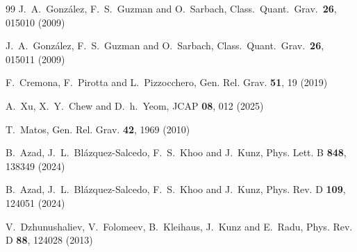 \documentclass[floats,floatfix,showpacs,amssymb,prd,superscriptaddress,nofootinbib,nolongbibliography,reprint]{revtex4-2}
\begin{document}
\begin{thebibliography}{99}
  J.~A.~Gonz\'alez, F.~S.~Guzman and O.~Sarbach,
  Class.\ Quant.\ Grav.\  {\bf 26}, 015010 (2009)

  J.~A.~Gonz\'alez, F.~S.~Guzman and O.~Sarbach,
  Class.\ Quant.\ Grav.\  {\bf 26},  015011 (2009)

F.~Cremona, F.~Pirotta and L.~Pizzocchero,
Gen. Rel. Grav. \textbf{51}, 19 (2019)

A.~Xu, X.~Y.~Chew and D.~h.~Yeom,
JCAP \textbf{08}, 012 (2025)
 
T.~Matos,
Gen. Rel. Grav. \textbf{42}, 1969 (2010)

B.~Azad, J.~L.~Bl\'azquez-Salcedo, F.~S.~Khoo and J.~Kunz,
Phys. Lett. B \textbf{848}, 138349 (2024)

B.~Azad, J.~L.~Bl{\'a}zquez-Salcedo, F.~S.~Khoo and J.~Kunz,
Phys. Rev. D \textbf{109}, 124051 (2024)

V.~Dzhunushaliev, V.~Folomeev, B.~Kleihaus, J.~Kunz and E.~Radu,
Phys. Rev. D \textbf{88}, 124028 (2013)


\end{thebibliography}
\end{document}
